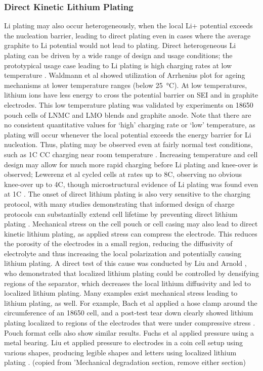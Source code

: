 \documentclass{article}
\begin{document}
\subsubsection{Direct Kinetic Lithium Plating}
Li plating may also occur heterogeneously, when the local Li+ potential exceeds the nucleation barrier, leading to direct plating even in cases where the average graphite to Li potential would not lead to plating. Direct heterogeneous Li plating can be driven by a wide range of design and usage conditions; the prototypical usage case leading to Li plating is high charging rates at low temperature \cite{waldmann_temperature_2014, petzl_lithium_2015}. Waldmann et al showed utilization of Arrhenius plot for ageing mechanisms at lower temperature ranges (below \SI{25}{\celsius}). At low temperatures, lithium ions have less energy to cross the potential barrier on SEI and in graphite electrodes. This low temperature plating was validated by experiments on 18650 pouch cells of LNMC and LMO blends and graphite anode. Note that there are no consistent quantitative values for ‘high’ charging rate or ‘low’ temperature, as plating will occur whenever the local potential exceeds the energy barrier for Li nucleation. Thus, plating may be observed even at fairly normal test conditions, such as 1C CC charging near room temperature \cite{waldmann_optimization_2015,burns_-situ_2015}. Increasing temperature and cell design may allow for much more rapid charging before Li plating and knee-over is observed; Lewerenz et al cycled cells at rates up to 8C, observing no obvious knee-over up to 4C, though microstructural evidence of Li plating was found even at 1C \cite{lewerenz_systematic_2017}. The onset of direct lithium plating is also very sensitive to the charging protocol, with many studies demonstrating that informed design of charge protocols can substantially extend cell lifetime by preventing direct lithium plating \cite{waldmann_optimization_2015,schindler_fast_2018}.
Mechanical stress on the cell pouch or cell casing may also lead to direct kinetic lithium plating, as applied stress can compress the electrode. This reduces the porosity of the electrodes in a small region, reducing the diffusivity of electrolyte and thus increasing the local polarization and potentially causing lithium plating. A direct test of this cause was conducted by Liu and Arnold \cite{liu_effects_2020}, who demonstrated that localized lithium plating could be controlled by densifying regions of the separator, which decreases the local lithium diffusivity and led to localized lithium plating. Many examples exist mechanical stress leading to lithium plating, as well. For example, Bach et al applied a hose clamp around the circumference of an 18650 cell, and a post-test tear down clearly showed lithium plating localized to regions of the electrodes that were under compressive stress \cite{bach_nonlinear_2016}. Pouch format cells also show similar results. Fuchs et al \cite{fuchs_post-mortem_2019} applied pressure using a metal bearing. Liu et applied pressure to electrodes in a coin cell setup using various shapes, producing legible shapes and letters using localized lithium plating \cite{liu_size_2018}.
(copied from 'Mechanical degradation section, remove either section)
\end{document}
